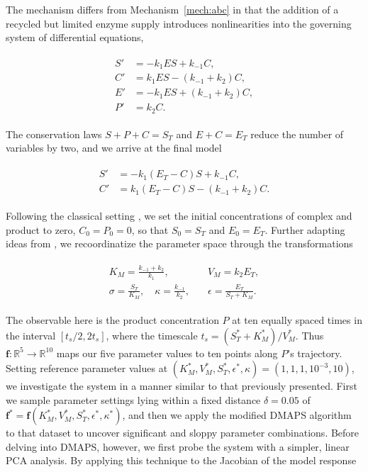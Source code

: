 The mechanism differs from Mechanism~\ref{mech:abc} in that the
addition of a recycled but limited enzyme supply introduces
nonlinearities into the governing system of differential equations,


\begin{align}
  \begin{split}
    S' &= -k_1 E S + k_{-1} C , \\
    C' &= k_1 E S - (k_{-1} + k_2) C , \\
    E' &= -k_1 E S + (k_{-1} + k_2) C , \\
    P' &= k_2 C .
  \end{split}
\end{align}


The conservation laws $S + P + C = S_T$ and $E + C = E_T$ reduce the
number of variables by two, and we arrive at the final model

\begin{align}
  \begin{split}
    S' &= -k_1 (E_T-C) S + k_{-1} C , \\
    C' &= k_1 (E_T-C) S - (k_{-1} + k_2) C .
    \label{eq:MM}
  \end{split}
\end{align}

Following the classical setting \cite{MM13,SS89}, we set the initial
concentrations of complex and product to zero, $C_0=P_0=0$, so that
$S_0 = S_T$ and $E_0 = E_T$.  Further adapting ideas from \cite{SS89},
we recoordinatize the parameter space through the transformations

\begin{align}
  \begin{split}
    K_M = \frac{k_{-1} + k_2}{k_1} , &\quad
    V_M = k_2 E_T , \\
    \sigma = \frac{S_T}{K_M} , \quad \kappa =
    \frac{k_{-1}}{k_2} , &\quad \epsilon = \frac{E_T}{S_T +
      K_M} .
    \label{eq:param-defs}
  \end{split}
\end{align}

The observable here is the product concentration $P$ at ten equally
spaced times in the interval $[t_s/2,2t_s]$, where the timescale
$t_s = (S_T^* + K_M^*)/V_M^*$. Thus
$\mathbf{f}:\mathbb{R}^5 \rightarrow \mathbb{R}^{10}$ maps our five
parameter values to ten points along $P$'s trajectory. Setting
reference parameter values at
$(K_M^*,V_M^*,S_T^*,\epsilon^*,\kappa) = (1,1,1,10^{-3},10)$, we
investigate the system in a manner similar to that previously
presented.  First we sample parameter settings lying within a fixed
distance $\delta=0.05$ of
$\mathbf{f}^* = \mathbf{f}(K_M^*, V_M^*, S_T^*, \epsilon^*,
\kappa^*)$, and then we apply the modified DMAPS algorithm to that
dataset to uncover significant and sloppy parameter combinations.
Before delving into DMAPS, however, we first probe the system with a
simpler, linear PCA analysis.  By applying this technique to the
Jacobian of the model response

